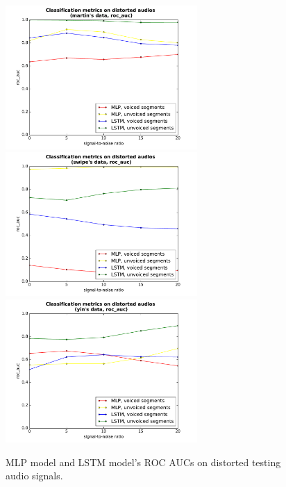 \documentclass[11pt,a4paper]{report}
\begin{document}
\begin{figure}[htbp]
  \centering
  \includegraphics[width=0.65\textwidth]{classification_metrics_voicedness_martin_roc_auc.pdf}
  \includegraphics[width=0.65\textwidth]{classification_metrics_voicedness_swipe_roc_auc.pdf}
  \includegraphics[width=0.65\textwidth]{classification_metrics_voicedness_yin_roc_auc.pdf}
  \caption{MLP model and LSTM model's ROC AUCs on distorted testing audio signals.}
  \label{fig:distorted-testing-data-roc-auc}
\end{figure}
\end{document}
